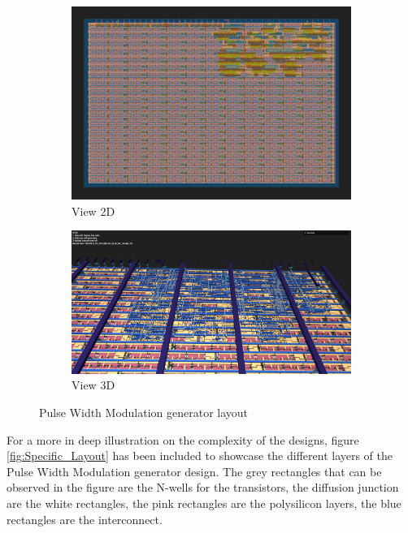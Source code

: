\begin{figure}[H]
    \centering
    \begin{subfigure}[b]{0.45\textwidth}
        \includegraphics[width=\linewidth]{Pictures/Result_PWM_2D_View.png}
        \caption{View 2D}\label{fig:PWM_2D}
    \end{subfigure}
    \begin{subfigure}[b]{0.45\textwidth}
        \includegraphics[width=\linewidth]{Pictures/Result_PWM_3D_View.png}
        \caption{View 3D}\label{fig:PWM_3D}
    \end{subfigure}
    \caption{Pulse Width Modulation generator layout}\label{fig:PWM}
\end{figure}



For a more in deep illustration on the complexity of the designs, figure \ref*{fig:Specific_Layout} 
has been included to showcase the different layers of the Pulse Width Modulation generator design.
The grey rectangles that can be observed in the figure are the N-wells for the transistors, 
the diffusion junction are the white rectangles, the pink rectangles are the polysilicon layers, 
the blue rectangles are the interconnect. 


